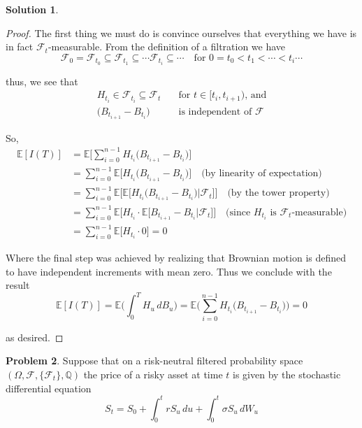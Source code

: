 \documentclass[12pt]{article}
\newlength\tindent
\renewcommand{\indent}{\hspace*{\tindent}}
\begin{document}
{\bf Solution 1}.
\begin{proof}
The first thing we must do is convince ourselves that everything we have is in fact $\mathcal F_t$-measurable. From the definition of a filtration we have
\begin{equation*}
	\mathcal F_0 = \mathcal F_{t_0} \subseteq \mathcal F_{t_1} \subseteq \cdots \mathcal F_{t_i} \subseteq \cdots \quad\text{for } 0 = t_0 < t_1 < \cdots < t_i \cdots 
\end{equation*}

thus, we see that
\begin{align*}
	H_{t_i} \in \mathcal F_{t_i} \subseteq \mathcal F_{t}& \quad \text{for $t \in [t_i,t_{i+1})$, and} \\
	\big(B_{t_{i+1}} - B_{t_i}\big)& \quad \text{is independent of $\mathcal F$}
\end{align*}

So,
\begin{align*}
	\mathbb E[I(T)] &= \mathbb E\Big[\sum^{n-1}_{i=0} H_{t_i}\big(B_{t_{i+1}} - B_{t_i}\big)\Big] \\
	&= \sum^{n-1}_{i=0} \mathbb E\Big[H_{t_i}\big(B_{t_{i+1}} - B_{t_i}\big)\Big] \quad \text{(by linearity of expectation)}\\
	&= \sum^{n-1}_{i=0} \mathbb E\Big[\mathbb E\big[ H_{t_i}\big(B_{t_{i+1}} - B_{t_i}\big)| \mathcal F_{t} \big]\Big] \quad \text{(by the tower property)} \\
	&= \sum^{n-1}_{i=0} \mathbb E\Big[H_{t_i} \cdot \mathbb E\big[B_{t_{i+1}} - B_{t_i}| \mathcal F_{t} \big]\Big] \quad \text{(since $H_{t_i}$ is $\mathcal F_t$-measurable)} \\
	&= \sum^{n-1}_{i=0} \mathbb E\Big[H_{t_i} \cdot 0\Big] = 0 
\end{align*}

\indent Where the final step was achieved by realizing that Brownian motion is defined to have independent increments with mean zero. Thus we conclude with the result
\begin{equation*}
	\mathbb E[I(T)] = \mathbb E\Bigg(\int^T_0 H_u\,dB_u\Bigg) = \mathbb E\Bigg(\sum^{n-1}_{i = 0}H_{t_i}\big(B_{t_{i+1}} - B_{t_i} \big)\Bigg) = 0
\end{equation*}

as desired.
\end{proof}
\hfill\newline 

{\bf Problem 2}. Suppose that on a risk-neutral filtered probability space $(\Omega,\mathcal F,\{\mathcal F_t\},\mathbb Q)$ the price of a risky asset at time $t$ is given by the stochastic differential equation
\begin{equation*}
	S_t = S_0 + \int^t_0 rS_u\,du + \int^t_0 \sigma S_u\,dW_u
\end{equation*}
\end{document}
